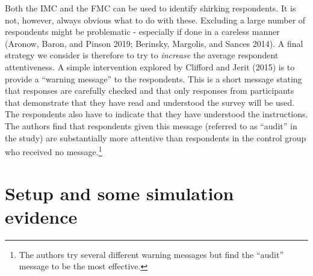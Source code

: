 \documentclass[]{article}
\let\rmarkdownfootnote\footnote%
\def\footnote{\protect\rmarkdownfootnote}
\begin{document}
Both the IMC and the FMC can be used to identify shirking respondents.
It is not, however, always obvious what to do with these. Excluding a
large number of respondents might be problematic - especially if done in
a careless manner (Aronow, Baron, and Pinson 2019; Berinsky, Margolis,
and Sances 2014). A final strategy we consider is therefore to try to
\emph{increase} the average respondent attentiveness. A simple
intervention explored by Clifford and Jerit (2015) is to provide a
``warning message'' to the respondents. This is a short message stating
that responses are carefully checked and that only responses from
participants that demonstrate that they have read and understood the
survey will be used. The respondents also have to indicate that they
have understood the instructions. The authors find that respondents
given this message (referred to as ``audit'' in the study) are
substantially more attentive than respondents in the control group who
received no message.\footnote{The authors try several different warning
  messages but find the ``audit'' message to be the most effective.}

\hypertarget{setup-and-some-simulation-evidence}{%
\section{Setup and some simulation
evidence}\label{setup-and-some-simulation-evidence}}
\end{document}
